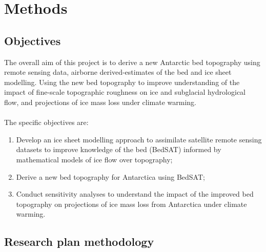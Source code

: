 \chapter{Methods}
\section{Objectives}

The overall aim of this project is to derive a new Antarctic bed topography using remote sensing data, airborne derived-estimates of the bed and ice sheet modelling. Using the new bed topography to improve understanding of the impact of fine-scale topographic roughness on ice and subglacial hydrological flow, and projections of ice mass loss under climate warming.\\
\\The specific objectives are:
\begin{enumerate}
    \item Develop an ice sheet modelling approach to assimilate satellite remote sensing datasets to improve knowledge of the bed (BedSAT) informed by mathematical models of ice flow over topography;
    \item Derive a new bed topography for Antarctica using BedSAT;
    \item Conduct sensitivity analyses to understand the impact of the improved bed topography on projections of ice mass loss from Antarctica under climate warming.
\end{enumerate}

\section{Research plan methodology}




